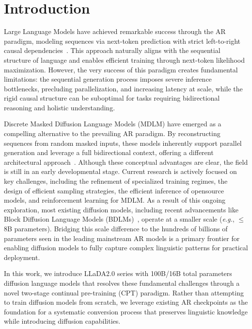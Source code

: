 \section{Introduction}

Large Language Models have achieved remarkable success through the AR paradigm, modeling sequences via next-token prediction with strict left-to-right causal dependencies~\citep{hurst2024gpt4o,grattafiori2024llama3,yang2025qwen3}. This approach naturally aligns with the sequential structure of language and enables efficient training through next-token likelihood maximization. However, the very success of this paradigm creates fundamental limitations: the sequential generation process imposes severe inference bottlenecks, precluding parallelization, and increasing latency at scale, while the rigid causal structure can be suboptimal for tasks requiring bidirectional reasoning and holistic understanding.

Discrete Masked Diffusion Language Models (MDLM) have emerged as a compelling alternative to the prevailing AR paradigm. By reconstructing sequences from random masked inputs, these models inherently support parallel generation and leverage a full bidirectional context, offering a different architectural approach~\citep{diffullama,yu_discrete_2025}. Although these conceptual advantages are clear, the field is still in an early developmental stage. Current research is actively focused on key challenges, including the refinement of specialized training regimes, the design of efficient sampling strategies, the efficient inference of opensource models, and reinforcement learning for MDLM. As a result of this ongoing exploration, most existing diffusion models, including recent advancements like Block Diffusion Language Models (BDLMs)~\citep{Blockdiffusion2025}, operate at a smaller scale (\textit{e.g.}, $\leq$8B parameters). Bridging this scale difference to the hundreds of billions of parameters seen in the leading mainstream AR models is a primary frontier for enabling diffusion models to fully capture complex linguistic patterns for practical deployment.

In this work, we introduce LLaDA2.0 series with 100B/16B total parameters diffusion language models that resolves these fundamental challenges through a novel two-stage continual pre-training (CPT) paradigm. Rather than attempting to train diffusion models from scratch, we leverage existing AR checkpoints as the foundation for a systematic conversion process that preserves linguistic knowledge while introducing diffusion capabilities.


